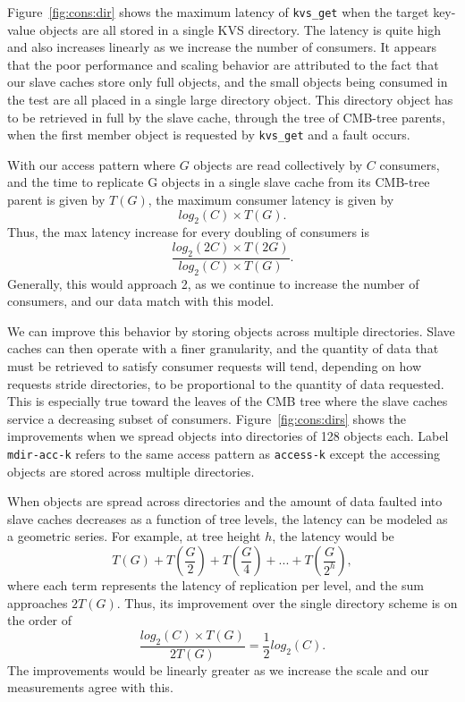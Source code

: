 Figure~\ref{fig:cons:dir} shows the maximum latency of {\tt kvs\_get}
when the target key-value objects are all stored in a single
KVS directory. The latency is quite high and also increases
linearly as we increase the number of consumers. 
It appears that the poor performance and scaling behavior 
are attributed to the fact that our slave caches store only full
objects, and the small objects being consumed in the test are all
placed in a single large directory object.
This directory object has to be retrieved in full by the slave cache,
through the tree of CMB-tree parents, when the first
member object is requested by {\tt kvs\_get} and a fault occurs.

With our access pattern where $G$ objects are read collectively by
$C$ consumers, and the time to replicate G objects in a single slave cache
from its CMB-tree parent is given by $T(G)$, the maximum consumer latency is given by
\begin{equation}
log_2(C) \times T(G).
\end{equation}
Thus, the max latency increase for every doubling of consumers is
\begin{equation}
\frac{log_2(2C) \times T(2G)}{log_2(C) \times T(G)}.
\end{equation}
Generally, this would approach 2, 
as we continue to increase the number of consumers,
and our data match with this model.

We can improve this behavior by storing objects across multiple
directories. Slave caches can then operate with a finer granularity,
and the quantity of data that must be retrieved to satisfy consumer
requests will tend, depending on how requests stride directories,
to be proportional to the quantity of data requested.
This is especially true toward the leaves of the CMB tree where the
slave caches service a decreasing subset of consumers.
Figure~\ref{fig:cons:dirs} shows the improvements 
when we spread objects into directories of 128 objects each.
Label {\tt mdir-acc-k} refers to the same access pattern as {\tt access-k} 
except the accessing objects are stored across multiple directories.

\ifcomments
{}
\fi
When objects are spread across directories and the amount of data
faulted into slave caches decreases as a function of tree levels, 
the latency can be modeled as a geometric series.
For example, at tree height $h$, the latency would be 
\begin{equation}
T(G) + T(\frac{G}{2}) + T(\frac{G}{4}) + ... + T(\frac{G}{2^h}),
\end{equation}
where each term represents the latency of replication per level,
and the sum approaches $2T(G)$. Thus, its improvement over the single
directory scheme is on the order of 
\begin{equation}
\frac{log_2(C) \times T(G)}{2 T(G)} = \frac{1}{2}log_2(C).
\end{equation}
The improvements would be linearly 
greater as we increase the scale and our measurements agree with this. 

